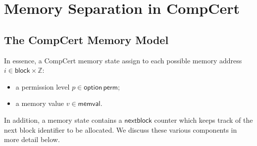 \documentclass[acmsmall,screen,review,anonymous,nonacm]{acmart}
\newcommand{\kw}[1]{\ensuremath{ \mathsf{#1} }}
\begin{document}
\section{Memory Separation in CompCert} \label{app:sep} %




\subsection{The CompCert Memory Model}

In essence,
a CompCert memory state
assign to each possible memory address $i \in \kw{block} \times \mathbb{Z}$:
\begin{itemize}
  \item a permission level $p \in \kw{option}\,\kw{perm}$;
  \item a memory value $v \in \kw{memval}$.
\end{itemize}
In addition,
a memory state contains a $\kw{nextblock}$ counter
which keeps track of the next block identifier to be allocated.
We discuss these various components in more detail below.
\end{document}
